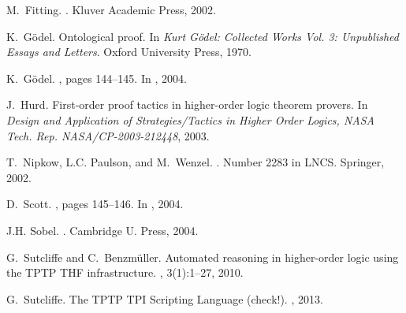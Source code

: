 \documentclass{easychair}
\begin{document}
\begin{thebibliography}{10}
M.~Fitting.
.
\newblock Kluver Academic Press, 2002.

K.~G\"odel.
\newblock Ontological proof.
\newblock In {\em {Kurt G\"odel: Collected Works Vol. 3: Unpublished Essays and
  Letters}}. Oxford University Press, 1970.

K.~G\"odel.
, pages 144--145.
\newblock In  \cite{sobel2004logic}, 2004.


J.~Hurd.
\newblock First-order proof tactics in higher-order logic theorem provers.
\newblock In {\em Design and Application of Strategies/Tactics in Higher Order
  Logics, NASA Tech. Rep. NASA/CP-2003-212448}, 2003.

T.~Nipkow, L.C. Paulson, and M.~Wenzel.
.
\newblock Number 2283 in LNCS. Springer, 2002.


D.~Scott.
, pages 145--146.
\newblock In  \cite{sobel2004logic}, 2004.

J.H. Sobel.
.
\newblock Cambridge U. Press, 2004.

G.~Sutcliffe and C.~Benzm{\"u}ller.
\newblock Automated reasoning in higher-order logic using the {TPTP THF}
  infrastructure.
, 3(1):1--27, 2010.

G.~Sutcliffe.
\newblock The TPTP TPI Scripting Language (check!).
, 2013.

\end{thebibliography}
\end{document}
